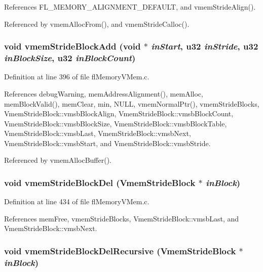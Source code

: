References FL\_\-MEMORY\_\-ALIGNMENT\_\-DEFAULT, and vmem\-Stride\-Align().

Referenced by vmem\-Alloc\-From(), and vmem\-Stride\-Calloc().
\subsubsection{\setlength{\rightskip}{0pt plus 5cm}void vmem\-Stride\-Block\-Add (void $\ast$ {\em in\-Start}, u32 {\em in\-Stride}, u32 {\em in\-Block\-Size}, u32 {\em in\-Block\-Count})}\label{flMemoryVMem_8h_a642a6370458c1f3b28e42ed4fa1876c}




Definition at line 396 of file fl\-Memory\-VMem.c.

References debug\-Warning, mem\-Address\-Alignment(), mem\-Alloc, mem\-Block\-Valid(), mem\-Clear, min, NULL, vmem\-Normal\-Ptr(), vmem\-Stride\-Blocks, Vmem\-Stride\-Block::vmsb\-Block\-Align, Vmem\-Stride\-Block::vmsb\-Block\-Count, Vmem\-Stride\-Block::vmsb\-Block\-Size, Vmem\-Stride\-Block::vmsb\-Block\-Table, Vmem\-Stride\-Block::vmsb\-Last, Vmem\-Stride\-Block::vmsb\-Next, Vmem\-Stride\-Block::vmsb\-Start, and Vmem\-Stride\-Block::vmsb\-Stride.

Referenced by vmem\-Alloc\-Buffer().
\subsubsection{\setlength{\rightskip}{0pt plus 5cm}void vmem\-Stride\-Block\-Del ({\bf Vmem\-Stride\-Block} $\ast$ {\em in\-Block})}\label{flMemoryVMem_8h_0733a131032b6396507ab6163e5da8dd}




Definition at line 434 of file fl\-Memory\-VMem.c.

References mem\-Free, vmem\-Stride\-Blocks, Vmem\-Stride\-Block::vmsb\-Last, and Vmem\-Stride\-Block::vmsb\-Next.
\subsubsection{\setlength{\rightskip}{0pt plus 5cm}void vmem\-Stride\-Block\-Del\-Recursive ({\bf Vmem\-Stride\-Block} $\ast$ {\em in\-Block})}\label{flMemoryVMem_8h_ec5ead58cf103c59c742d84eb9266176}




